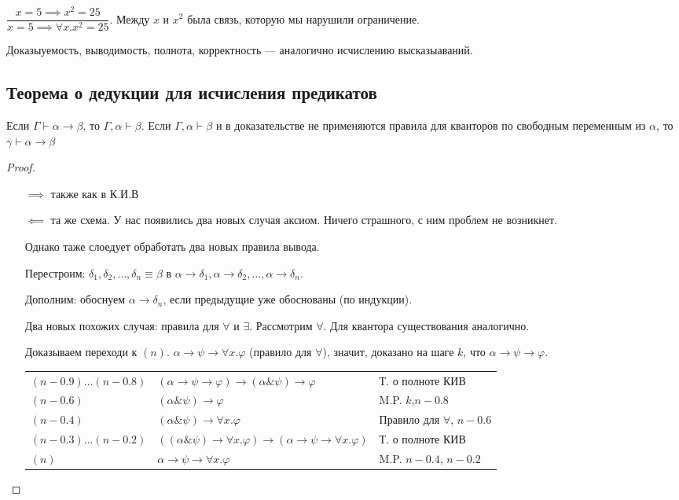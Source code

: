 \begin{example}
$\dfrac{x = 5 \implies x^2 = 25}{x = 5 \implies \forall x. x^2 = 25}$. Между $x$ и $x^2$ была связь, которую мы нарушили ограничение.
\end{example}

\begin{statement}
    Доказыуемость, выводимость, полнота, корректность --- аналогично исчислению высказыаваний.
\end{statement}


\subsection{Теорема о дедукции для исчисления предикатов}
\begin{theorem}
    Если    $\Gamma \vdash \alpha \to \beta$, то $\Gamma, \alpha \vdash \beta$.
    Если $\Gamma, \alpha\vdash \beta$ и в доказательстве не применяются правила для кванторов по свободным переменным из $\alpha$, то $\gamma\vdash \alpha \to \beta$
\end{theorem}
\begin{proof}
    \begin{itemize}
        \item []
        \item [$\implies $] также как в К.И.В
        \item [$\impliedby $] та же схема. У нас появились два новых случая аксиом. Ничего страшного, с ним проблем не возникнет.

Однако таже слоедует обработать два новых правила вывода.

Перестроим: $\delta_1, \delta_2, \dots, \delta_n \equiv \beta$ в $\alpha\rightarrow\delta_1, \alpha\rightarrow\delta_2, \dots, \alpha\rightarrow\delta_n$.

Дополним: обоснуем $\alpha\rightarrow\delta_n$, если предыдущие уже обоснованы (по индукции).

Два новых похожих случая: правила для $\forall$ и $\exists$. Рассмотрим $\forall$. Для квантора существования аналогично.

Доказываем переходи к $(n)$. $\alpha\rightarrow\psi\rightarrow\forall x.\varphi$ (правило для $\forall$), значит, доказано
на шаге $k$, что $\alpha\rightarrow\psi\rightarrow\varphi$.

\begin{tabular}{lll}
$(n-0.9) \dots (n-0.8)$ &
$(\alpha\rightarrow\psi\rightarrow\varphi)\rightarrow(\alpha\&\psi)\rightarrow\varphi$ &
Т. о полноте КИВ\\
$(n-0.6)$ & $(\alpha \& \psi)\rightarrow\varphi$ & M.P. $k$,$n-0.8$\\
$(n-0.4)$ & $(\alpha \& \psi)\rightarrow\forall x.\varphi$ & Правило для $\forall$, $n-0.6$\\
$(n-0.3) \dots (n-0.2)$ & $((\alpha\&\psi)\rightarrow\forall x.\varphi)\rightarrow(\alpha\rightarrow\psi\rightarrow\forall x.\varphi)$ & Т. о полноте КИВ\\
$(n)$ & $\alpha\rightarrow\psi\rightarrow\forall x.\varphi$ & M.P. $n-0.4$, $n-0.2$
\end{tabular}
    \end{itemize}
\end{proof}

